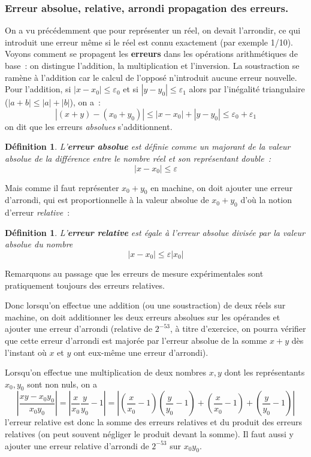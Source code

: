 \documentclass[a4paper,11pt]{article}
\newtheorem{defn}[thm]{D\'efinition}
\begin{document}
\begin{giacjshere}
\subsubsection{Erreur absolue, relative, arrondi propagation des erreurs.}
On a vu pr\'ec\'edemment que pour repr\'esenter un r\'eel, on devait
l'arrondir, ce qui introduit une erreur m\^eme si le r\'eel est
connu exactement (par exemple 1/10).
Voyons comment se propagent les {\bf erreurs} 
dans les opérations arithmétiques
de base~: on distingue l'addition, la multiplication
et l'inversion. La soustraction se ramène à l'addition car
le calcul de l'opposé n'introduit aucune erreur nouvelle.
Pour l'addition, si $|x -x_0| \leq \varepsilon_0$ et si $|y-y_0| \leq \varepsilon_1$
alors par l'inégalité triangulaire ($|a+b|\leq |a|+|b|$), on a~:
\[ |(x+y)-(x_0+y_0)| \leq |x-x_0| + | y-y_0 | \leq 
\varepsilon_0 + \varepsilon_1 \]
on dit que les erreurs {\em absolues\/} s'additionnent. 
\begin{defn}
L'{\bf erreur absolue}
est définie comme un majorant de la valeur absolue
de la différence entre le nombre réel et
son représentant double~:
\[ |x-x_0| \leq \varepsilon \]
\end{defn}
Mais comme il faut représenter $x_0+y_0$
en machine, on doit ajouter une erreur d'arrondi, qui est
proportionnelle \`a la valeur absolue de $x_0+y_0$ d'o\`u la notion
d'erreur {\em relative}~:
\begin{defn}
L'{\bf erreur relative} 
est égale à l'erreur absolue divisée par
la valeur absolue du nombre
\[ |x-x_0| \leq \varepsilon |x_0| \]
\end{defn}
Remarquons au passage que les erreurs de mesure expérimentales sont 
pratiquement toujours des erreurs relatives.

Donc lorsqu'on effectue une addition (ou une soustraction) de deux réels
sur machine, on doit additionner les deux erreurs absolues sur les opérandes
et ajouter une erreur d'arrondi (relative de $2^{-53}$, à titre
d'exercice, on pourra vérifier que cette erreur
d'arrondi est majorée par l'erreur absolue de la somme 
$x+y$ dès l'instant où
$x$ et $y$ ont eux-même une erreur d'arrondi).

Lorsqu'on effectue une multiplication de deux nombres $x,y$ dont les
représentants $x_0,y_0$ sont non nuls, on a
\[ \left| \frac{xy-x_0 y_0}{x_0 y_0} \right| = 
\left| \frac{x}{x_0} \frac{y}{y_0} -1 \right|
= \left| 
(\frac{x}{x_0}-1)(\frac{y}{y_0} -1)+(\frac{x}{x_0}-1)+(\frac{y}{y_0} -1) 
\right|  \]
l'erreur relative est donc la somme des erreurs relatives et du produit
des erreurs relatives (on peut souvent négliger le produit devant la somme). Il
faut aussi y ajouter une erreur relative d'arrondi de $2^{-53}$ sur $x_0 y_0$.


\end{giacjshere}
\end{document}
